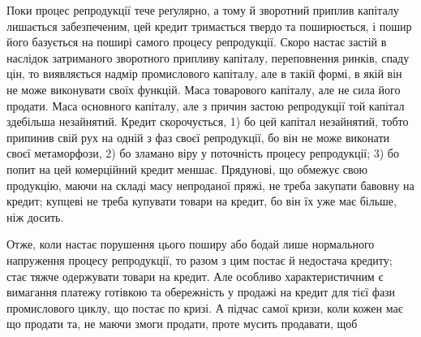 Поки процес репродукції тече реґулярно, а тому й зворотний приплив капіталу
лишається забезпеченим, цей кредит тримається твердо та поширюється, і пошир
його базується на поширі самого процесу репродукції. Скоро настає застій
в наслідок затриманого зворотного припливу капіталу, переповнення ринків, спаду
цін, то виявляється надмір промислового капіталу, але в такій формі, в якій він
не може виконувати своїх функцій. Маса товарового капіталу, але не сила
його продати. Маса основного капіталу, але з причин застою репродукції той
капітал здебільша незайнятий. Кредит скорочується, 1) бо цей капітал незайнятий,
тобто припинив свій рух на одній з фаз своєї репродукції, бо він не може
виконати своєї метаморфози, 2) бо зламано віру у поточність процесу репродукції;
3) бо попит на цей комерційний кредит меншає. Прядунові, що обмежує
свою продукцію, маючи на складі масу непроданої пряжі, не треба закупати
бавовну на кредит; купцеві не треба купувати товари на кредит, бо він їх
уже має більше, ніж досить.

Отже, коли настає порушення цього поширу або бодай лише нормального
напруження процесу репродукції, то разом з цим постає й недостача кредиту;
стає тяжче одержувати товари на кредит. Але особливо характеристичним є вимагання
платежу готівкою та обережність у продажі на кредит для тієї фази
промислового циклу, що постає по кризі. А підчас самої кризи, коли кожен
має що продати та, не маючи змоги продати, проте мусить продавати, щоб
